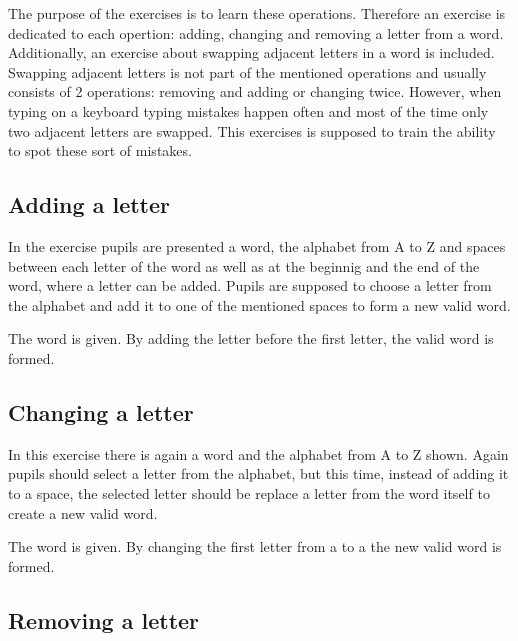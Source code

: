 The purpose of the  exercises is to learn these operations. Therefore an exercise is dedicated to each opertion: adding, changing and removing a letter from a word. Additionally, an exercise about swapping adjacent letters in a word is included. Swapping adjacent letters is not part of the mentioned operations and usually consists of 2 operations: removing and adding or changing twice. However, when typing on a keyboard typing mistakes happen often and most of the time only two adjacent letters are swapped. This exercises is supposed to train the ability to spot these sort of mistakes.

\subsection*{Adding a letter}

In the  exercise pupils are presented a word, the alphabet from A to Z and spaces between each letter of the word as well as at the beginnig and the end of the word, where a letter can be added. Pupils are supposed to choose a letter from the alphabet and add it to one of the mentioned spaces to form a new valid word.

\begin{example}
    The word  is given. By adding the letter  before the first letter, the valid word  is formed.
\end{example}

\subsection*{Changing a letter}

In this exercise there is again a word and the alphabet from A to Z shown. Again pupils should select a letter from the alphabet, but this time, instead of adding it to a space, the selected letter should be replace a letter from the word itself to create a new valid word.

\begin{example}
    The word  is given. By changing the first letter from a  to a  the new valid word  is formed.
\end{example}

\subsection*{Removing a letter}


